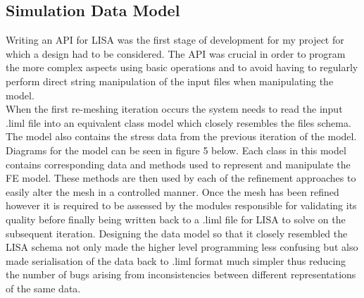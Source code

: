 \subsection{Simulation Data Model}
Writing an API for LISA was the first stage of development for my project for which a design had to be considered. The API was crucial in order to program the more complex aspects using basic operations and to avoid having to regularly perform direct string manipulation of the input files when manipulating the model. \\

\noindent
When the first re-meshing iteration occurs the system needs to read the input .liml file into an equivalent class model which closely resembles the files schema. The model also contains the stress data from the previous iteration of the model. Diagrams for the model can be seen in figure 5 below. Each class in this model contains corresponding data and methods used to represent and manipulate the FE model. These methods are then used by each of the refinement approaches to easily alter the mesh in a controlled manner. Once the mesh has been refined however it is required to be assessed by the modules responsible for validating its quality before finally being written back to a .liml file for LISA to solve on the subsequent iteration. Designing the data model so that it closely resembled the LISA schema not only made the higher level programming less confusing but also made serialisation of the data back to .liml format much simpler  thus reducing the number of bugs arising from inconsistencies between different representations of the same data. \\





